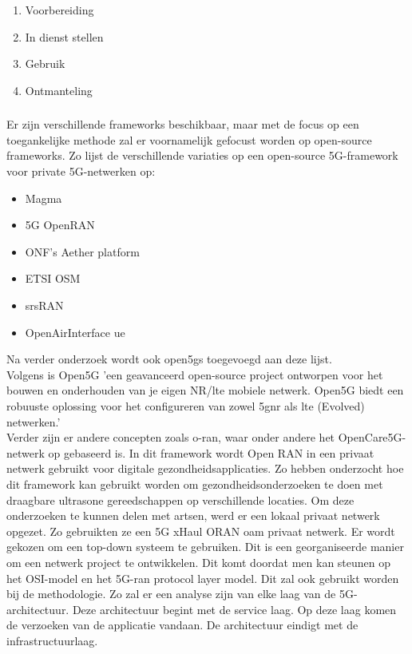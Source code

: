 \begin{enumerate}
  \item Voorbereiding
  \item In dienst stellen
  \item Gebruik
  \item Ontmanteling
\end{enumerate}

\subsubsection{}

Er zijn verschillende frameworks beschikbaar, maar met de focus op een toegankelijke methode zal er voornamelijk gefocust worden op open-source frameworks. Zo lijst \textcite{Eswaran2022} de verschillende variaties op een open-source 5G-framework voor private 5G-netwerken op:

\begin{itemize}
  \item Magma
  \item 5G OpenRAN
  \item ONF's Aether platform
  \item ETSI OSM
  \item \gls{srsRAN}
  \item OpenAirInterface \gls{ue}
\end{itemize}

Na verder onderzoek wordt ook \gls{open5gs} toegevoegd aan deze lijst.\\

Volgens \textcite{Open5GS2024} is Open5G 'een geavanceerd open-source project ontworpen voor het bouwen en onderhouden van je eigen NR/\gls{lte} mobiele netwerk. Open5G biedt een robuuste oplossing voor het configureren van zowel \gls{5gnr} als \gls{lte} (Evolved) netwerken.' \\ Verder zijn er andere concepten zoals \gls{o-ran}, waar onder andere het OpenCare5G-netwerk op gebaseerd is. In dit framework wordt Open RAN in een privaat netwerk gebruikt voor digitale gezondheidsapplicaties. Zo hebben \textcite{de2023opencare5g} onderzocht hoe dit framework kan gebruikt worden om gezondheidsonderzoeken te doen met draagbare ultrasone gereedschappen op verschillende locaties. Om deze onderzoeken te kunnen delen met artsen, werd er een lokaal privaat netwerk opgezet. Zo gebruikten ze een 5G xHaul ORAN \gls{oam} privaat netwerk. Er wordt gekozen om een top-down systeem te gebruiken. Dit is een georganiseerde manier om een netwerk project te ontwikkelen. Dit komt doordat men kan steunen op het OSI-model en het 5G-\gls{ran} protocol layer model. Dit zal ook gebruikt worden bij de methodologie. Zo zal er een analyse zijn van elke laag van de 5G-architectuur. Deze architectuur begint met de service laag. Op deze laag komen de verzoeken van de applicatie vandaan. De architectuur eindigt met de infrastructuurlaag. \autocite{de2023opencare5g}

